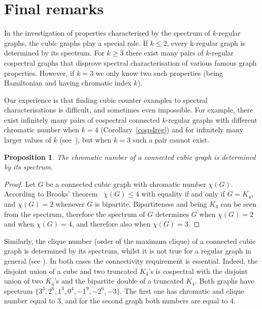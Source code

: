 \documentclass{article}
\newtheorem{proposition}{Proposition}
\begin{document}
\section{Final remarks}
In the investigation of properties characterised by the spectrum of $k$-regular graphs, 
the cubic graphs play a special role.
If $k\leq 2$, every k-regular graph is determined by its spectrum.
For $k\geq 3$ there exist many pairs of $k$-regular cospectral graphs that disprove spectral characterisation of various famous graph properties.
However, if $k=3$ we only know two such properties (being Hamiltonian and having chromatic index $k$).

Our experience is that finding cubic counter examples to spectral characterisations is difficult, and sometimes even impossible.
For example, there exist infinitely many pairs of cospectral connected $k$-regular graphs with different chromatic number when $k = 4$ (Corollary~\ref{cosp4reg}) and for infinitely many larger values of $k$ (see~\cite{EH}), but when $k=3$ such a pair cannot exist.

\begin{proposition}
The chromatic number of a connected cubic graph is determined by its spectrum.
\end{proposition}

\begin{proof}
Let $G$ be a connected cubic graph with chromatic number $\chi(G)$.
According to Brooks' theorem~\cite{B} $\chi(G)\leq 4$ with equality if and only if $G=K_4$, and $\chi(G)=2$ whenever $G$ is bipartite.
Bipartiteness and being $K_4$ can be seen from the spectrum, therefore the spectrum of $G$ determines $G$ when $\chi(G)= 2$ and when $\chi(G)=4$, and therefore also when $\chi(G)=3$.
\end{proof}
%
Similarly, the clique number (order of the maximum clique) of a connected cubic graph is determined by its spectrum, whilst it is not true for a regular graph in general (see \cite{EH}).
In both cases the connectivity requirement is essential.
Indeed, the disjoint union of a cube and two truncated $K_4$'s is cospectral with
the disjoint union of two $K_4$'s and the bipartite double of a truncated $K_4$.
Both graphs have spectrum $\{3^3,2^6,1^3,0^4,-1^9,-2^6,-3\}$.
The first one has chromatic and clique number equal to 3, 
and for the second graph both numbers are equal to 4.
\\
\end{document}
